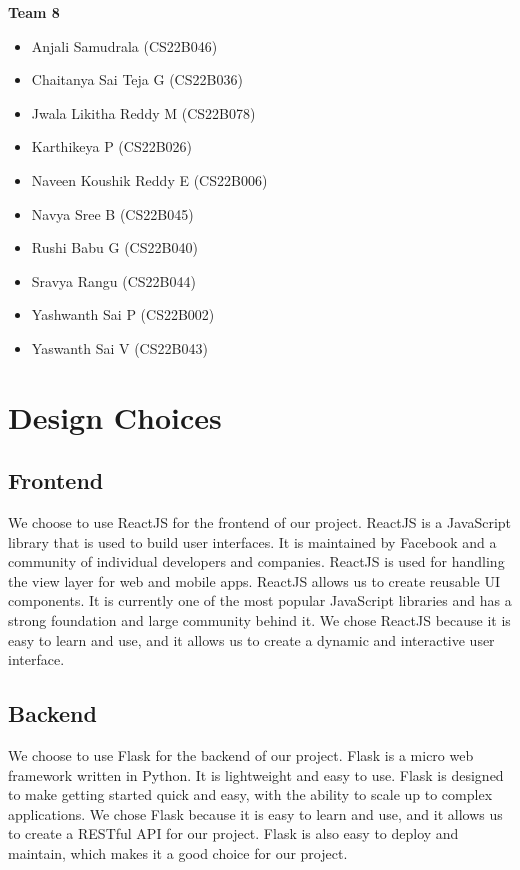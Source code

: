 \documentclass[12pt]{article}
\begin{document}
\begin{center}
    \noindent \textbf{Team 8}
    \begin{multicols}{2}
        \begin{itemize}
            \item Anjali Samudrala (CS22B046)
            \item Chaitanya Sai Teja G (CS22B036)
            \item Jwala Likitha Reddy M (CS22B078)
            \item Karthikeya P (CS22B026)
            \item Naveen Koushik Reddy E (CS22B006)
            \item Navya Sree B (CS22B045)
            \item Rushi Babu G (CS22B040)
            \item Sravya Rangu (CS22B044)
            \item Yashwanth Sai P (CS22B002)
            \item Yaswanth Sai V (CS22B043)
        \end{itemize}
    \end{multicols}
    \vspace{0.5cm}

\end{center}
\clearpage

\section{Design Choices}
\subsection{Frontend}
We choose to use ReactJS for the frontend of our project. ReactJS is a JavaScript library that is used to build user interfaces. It is maintained by Facebook and a community of individual developers and companies. ReactJS is used for handling the view layer for web and mobile apps. ReactJS allows us to create reusable UI components. It is currently one of the most popular JavaScript libraries and has a strong foundation and large community behind it. We chose ReactJS because it is easy to learn and use, and it allows us to create a dynamic and interactive user interface.

\subsection{Backend}
We choose to use Flask for the backend of our project. Flask is a micro web framework written in Python. It is lightweight and easy to use. Flask is designed to make getting started quick and easy, with the ability to scale up to complex applications. We chose Flask because it is easy to learn and use, and it allows us to create a RESTful API for our project. Flask is also easy to deploy and maintain, which makes it a good choice for our project.
\end{document}
